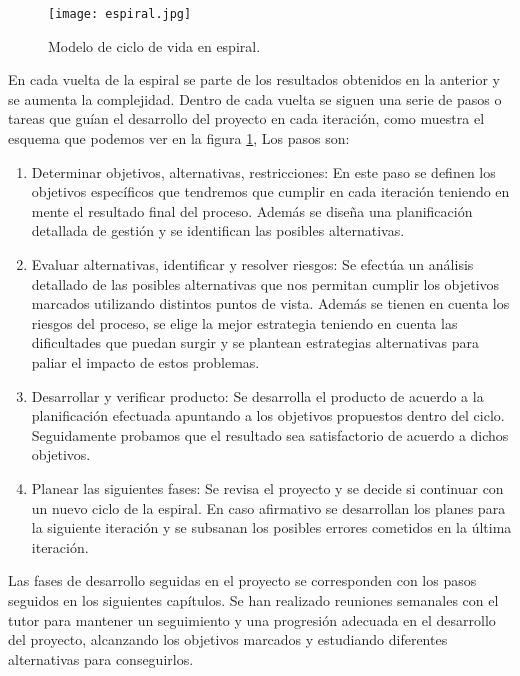 \begin{figure}[hb]
	\centering\texttt{[image: espiral.jpg]}
	\caption{Modelo de ciclo de vida en espiral.}
	\label{fig:espiral}
\end{figure}

En cada vuelta de la espiral se parte de los resultados obtenidos en la anterior y se aumenta la complejidad. Dentro de cada vuelta se siguen una serie de pasos o tareas que guían el desarrollo del proyecto en cada iteración, como muestra el esquema que podemos ver en la figura \ref{fig:espiral}, Los pasos son:
\begin{enumerate}[1.]
	\item Determinar objetivos, alternativas, restricciones: En este paso se definen los objetivos específicos que tendremos que cumplir en cada iteración teniendo en mente el resultado final del proceso. Además se diseña una planificación detallada de gestión y se identifican las posibles alternativas. 
	
	\item Evaluar alternativas, identificar y resolver riesgos: Se efectúa un análisis detallado de las posibles alternativas que nos permitan cumplir los objetivos marcados utilizando distintos puntos de vista. Además se tienen en cuenta los riesgos del proceso, se elige la mejor estrategia teniendo en cuenta las dificultades que puedan surgir y se plantean estrategias alternativas para paliar el impacto de estos problemas.
	
	\item Desarrollar y verificar producto: Se desarrolla el producto de acuerdo a la planificación efectuada apuntando a los objetivos propuestos dentro del ciclo. Seguidamente probamos que el resultado sea satisfactorio de acuerdo a dichos objetivos.
	
	\item Planear las siguientes fases: Se revisa el proyecto y se decide si continuar con un nuevo ciclo de la espiral. En caso afirmativo se desarrollan los planes para la siguiente iteración y se subsanan los posibles errores cometidos en la última iteración.
	
\end{enumerate}

Las fases de desarrollo seguidas en el proyecto se corresponden con los pasos seguidos en los siguientes capítulos. Se han realizado reuniones semanales con el tutor para mantener un seguimiento y una progresión adecuada en el desarrollo del proyecto, alcanzando los objetivos marcados y estudiando diferentes alternativas para conseguirlos.

